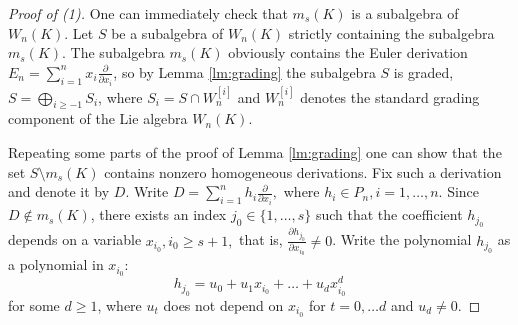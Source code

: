 \documentclass[10pt,a4paper]{amsart}
\begin{document}
\begin{proof}[Proof of (1)]
	One can immediately check that $m_s(K)$ is a subalgebra of $W_n(K)$. Let $S$ be a   subalgebra of $W_n(K)$ strictly containing the subalgebra  $m_s(K)$.
	The subalgebra $m_s(K)$ obviously contains the Euler derivation $E_n = \sum_{i=1}^n x_i \frac{\partial}{\partial x_i}$, so 
	by Lemma \ref{lm:grading} the subalgebra $S$ is graded, $S = \bigoplus_{i \ge -1} S_i$, where  $S_i=S\cap W_n^{[i]} $ and $W_n^{[i]}$ denotes the standard grading component of the Lie algebra $W_n(K)$.
	
	Repeating some parts of the proof of Lemma \ref{lm:grading} one  can show that the set $S \setminus m_s(K)$ contains nonzero  homogeneous derivations. Fix such a derivation and denote it by $D$.
	Write $D = \sum_{i=1}^n h_i \frac{\partial}{\partial x_i}, $ where  $h_i\in P_n, i=1, \ldots , n.$ Since $D \notin m_s(K)$, there exists an index $j_0 \in \{1, \dots, s\}$ such that the coefficient $h_{j_0}$ depends on a variable $x_{i_0}, i_0 \ge s + 1,$ that is, $\frac{\partial h_{j_0}}{\partial x_{i_0}}\not =0$. 	
	Write  the polynomial $h_{j_0}$ as a polynomial in  $x_{i_0}$:
	\[
	h_{j_0} = u_0 + u_1 x_{i_0} + \dots + u_d x_{i_0}^d
	\]
	for some $d \ge 1$, where $u_t$ does not depend on $x_{i_0}$ for $t=0,\dots d$  and $u_d \neq 0.$
	

\end{proof}
\end{document}
